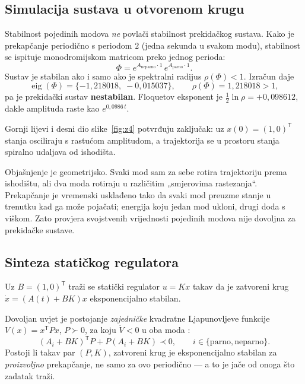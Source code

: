 \subsection{Simulacija sustava u otvorenom krugu}
\label{sec:zad4:simulacija}

Stabilnost pojedinih modova \emph{ne} povlači stabilnost prekidačkog sustava.
Kako je prekapčanje periodično s periodom $2$ (jedna sekunda u svakom modu),
stabilnost se ispituje monodromijskom matricom preko jednog perioda:
\begin{equation}
  \Phi = e^{A_{\text{neparno}}\cdot 1}\,e^{A_{\text{parno}}\cdot 1} .
\end{equation}
Sustav je stabilan ako i samo ako je spektralni radijus $\rho(\Phi) < 1$.
Izračun daje
\begin{equation}
  \operatorname{eig}(\Phi) = \{-1{,}218018,\; -0{,}015037\}, \qquad
  \rho(\Phi) = 1{,}218018 > 1 ,
\end{equation}
pa je prekidački sustav \textbf{nestabilan}. Floquetov eksponent je
$\tfrac{1}{2}\ln\rho = +0{,}098612$, dakle amplituda raste kao $e^{0{,}0986\,t}$.

Gornji lijevi i desni dio slike~\ref{fig:z4} potvrđuju zaključak: uz
$x(0) = (1,0)^{\mathsf T}$ stanja osciliraju s rastućom amplitudom, a trajektorija
se u prostoru stanja spiralno udaljava od ishodišta.

Objašnjenje je geometrijsko. Svaki mod sam za sebe rotira trajektoriju prema
ishodištu, ali dva moda rotiraju u različitim „smjerovima rastezanja“. Prekapčanje
je vremenski usklađeno tako da svaki mod preuzme stanje u trenutku kad ga može
pojačati; energija koju jedan mod ukloni, drugi doda s viškom. Zato provjera
svojstvenih vrijednosti pojedinih modova nije dovoljna za prekidačke sustave.

\subsection{Sinteza statičkog regulatora}
\label{sec:zad4:regulator}

Uz $B = (1,0)^{\mathsf T}$ traži se statički regulator $u = Kx$ takav da je
zatvoreni krug $\dot{x} = (A(t) + BK)x$ eksponencijalno stabilan.

Dovoljan uvjet je postojanje \emph{zajedničke} kvadratne Ljapunovljeve funkcije
$V(x) = x^{\mathsf T}Px$, $P \succ 0$, za koju $\dot V < 0$ u oba moda
\cite[str.~4]{jokic_ljapunov}:
\begin{equation}
  (A_i + BK)^{\mathsf T}P + P(A_i + BK) \prec 0, \qquad i \in \{\text{parno}, \text{neparno}\} .
  \label{eq:z4lmi}
\end{equation}
Postoji li takav par $(P,K)$, zatvoreni krug je eksponencijalno stabilan za
\emph{proizvoljno} prekapčanje, ne samo za ovo periodično --- a to je jače od
onoga što zadatak traži.

